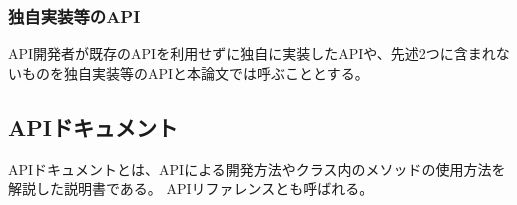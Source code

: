\subsubsection {独自実装等のAPI}
API開発者が既存のAPIを利用せずに独自に実装したAPIや、先述2つに含まれないものを独自実装等のAPIと本論文では呼ぶこととする。

\fi

\subsection{APIドキュメント}
APIドキュメントとは、APIによる開発方法やクラス内のメソッドの使用方法を解説した説明書である。
APIリファレンス\cite{API_reference}とも呼ばれる。




























